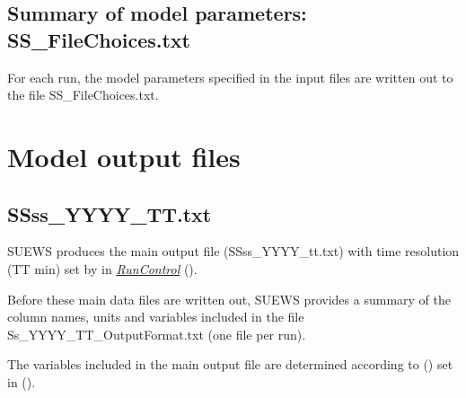 \documentclass[letterpaper,10pt,english]{sphinxmanual}
\begin{document}
\subsection{Summary of model parameters: SS\_FileChoices.txt}
\label{\detokenize{output_files/output_files:summary-of-model-parameters-ss-filechoices-txt}}
For each run, the model parameters specified in the input files are
written out to the file SS\_FileChoices.txt.


\section{Model output files}
\label{\detokenize{output_files/output_files:model-output-files}}

\subsection{SSss\_YYYY\_TT.txt}
\label{\detokenize{output_files/output_files:ssss-yyyy-tt-txt}}
SUEWS produces the main output file (SSss\_YYYY\_tt.txt) with time
resolution (TT min) set by  in
{\hyperref[\detokenize{output_files/output_files:RunControl}]{\emph{RunControl}}} ().

Before these main data files are written out, SUEWS provides a summary
of the column names, units and variables included in the file
Ss\_YYYY\_TT\_OutputFormat.txt (one file per run).

The variables included in the main output file are determined according
to {\hyperref[\detokenize{input_files/RunControl/File_related_options:cmdoption-arg-writeoutoption}]{}} () set in {\hyperref[\detokenize{input_files/RunControl/RunControl:runcontrol-nml}]{}} ().
\end{document}
